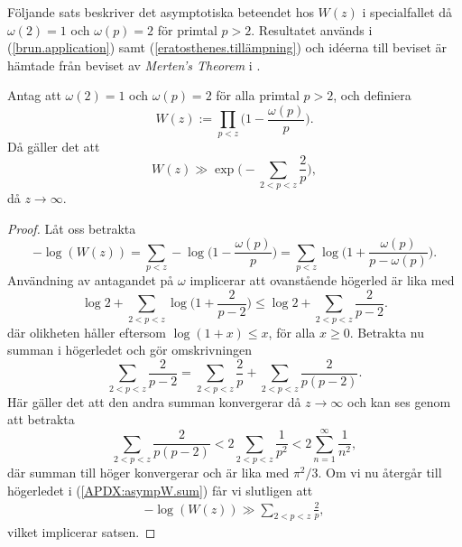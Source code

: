 Följande sats beskriver det asymptotiska beteendet hos $W(z)$ i specialfallet då $\omega(2)=1$ och $\omega(p)=2$ för primtal $p>2$. 
Resultatet används i (\ref{brun.application}) samt (\ref{eratosthenes.tillämpning}) och idéerna till beviset är hämtade från beviset av \textit{Merten's Theorem} i \cite[kap.5.2]{cojocarumurty}.

\begin{theorem} \label{APDX:asympW}
Antag att $\omega(2)=1$ och $\omega(p)=2$ för alla primtal $p>2$, och definiera 
\begin{equation*}
    W(z):=\prod_{p<z}\biggl( 1-\frac{\omega(p)}{p} \biggr).   
\end{equation*}
Då gäller det att
\begin{equation} \label{APDX:asympW.main}
    W(z) \gg \exp \biggl( - \sum_{2 <p < z} \frac{2}{p}  \biggr),
\end{equation}
då $z\to\infty$.
\end{theorem}


\begin{proof}
Låt oss betrakta
\begin{equation*}
    -\log(W(z)) 
    = \sum_{p < z} -\log\biggl( 1-\frac{\omega(p)}{p} \biggr) 
    = \sum_{p < z} \log\biggl( 1+\frac{\omega(p)}{p-\omega(p)} \biggr).
\end{equation*}
Användning av antagandet på $\omega$ implicerar att ovanstående högerled är lika med 
\begin{equation} \label{APDX:asympW.sum}
    \log 2 + \sum_{2<p<z} \log\biggl( 1+\frac{2}{p-2} \biggr)
    \leq \log 2 + \sum_{2<p<z} \frac{2}{p-2}.
\end{equation}
där olikheten håller eftersom $\log(1+x)\leq x$, för alla $x\geq0$. 
Betrakta nu summan i högerledet och gör omskrivningen
\begin{equation*}
    \sum_{2 <p < z} \frac{2}{p-2} = \sum_{2 <p < z} \frac{2}{p} + \sum_{2 <p < z} \frac{2}{p(p-2)}.
\end{equation*}
Här gäller det att den andra summan konvergerar då $z\to\infty$ och kan ses genom att betrakta
\begin{equation*}
    \sum_{2 <p < z} \frac{2}{p(p-2)} < 2\sum_{2 <p < z} \frac{1}{p^2} < 2\sum_{n = 1}^\infty \frac{1}{n^2},
\end{equation*}
där summan till höger konvergerar och är lika med $\pi^2/3$.
Om vi nu återgår till högerledet i (\ref{APDX:asympW.sum}) får vi slutligen att
\begin{align*}
    -\log(W(z)) \gg \sum_{2 <p < z} \frac{2}{p},
\end{align*}
vilket implicerar satsen.
\end{proof}